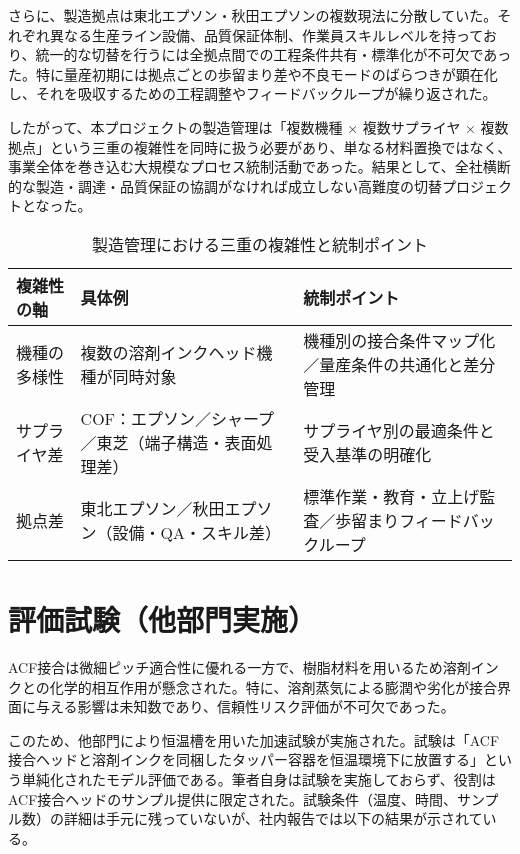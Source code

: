 \documentclass[conference]{IEEEtran}
\begin{document}
さらに、製造拠点は東北エプソン・秋田エプソンの複数現法に分散していた。それぞれ異なる生産ライン設備、品質保証体制、作業員スキルレベルを持っており、統一的な切替を行うには全拠点間での工程条件共有・標準化が不可欠であった。特に量産初期には拠点ごとの歩留まり差や不良モードのばらつきが顕在化し、それを吸収するための工程調整やフィードバックループが繰り返された。  

したがって、本プロジェクトの製造管理は「複数機種 × 複数サプライヤ × 複数拠点」という三重の複雑性を同時に扱う必要があり、単なる材料置換ではなく、事業全体を巻き込む大規模なプロセス統制活動であった。結果として、全社横断的な製造・調達・品質保証の協調がなければ成立しない高難度の切替プロジェクトとなった。

\begin{table}[t]
\centering
\footnotesize
\caption{製造管理における三重の複雑性と統制ポイント}
\label{tab:complexity}
\renewcommand{\arraystretch}{1.1}
\begin{tabularx}{\columnwidth}{@{}p{2.4cm} Y Y@{}}
\toprule
複雑性の軸 & 具体例 & 統制ポイント \\
\midrule
機種の多様性 &
複数の溶剤インクヘッド機種が同時対象 &
機種別の接合条件マップ化／量産条件の共通化と差分管理 \\
\addlinespace[2pt]
サプライヤ差 &
COF：エプソン／シャープ／東芝（端子構造・表面処理差） &
サプライヤ別の最適条件と受入基準の明確化 \\
\addlinespace[2pt]
拠点差 &
東北エプソン／秋田エプソン（設備・QA・スキル差） &
標準作業・教育・立上げ監査／歩留まりフィードバックループ \\
\bottomrule
\end{tabularx}
\end{table}

\section{評価試験（他部門実施）}
ACF接合は微細ピッチ適合性に優れる一方で、樹脂材料を用いるため溶剤インクとの化学的相互作用が懸念された。特に、溶剤蒸気による膨潤や劣化が接合界面に与える影響は未知数であり、信頼性リスク評価が不可欠であった。  

このため、他部門により恒温槽を用いた加速試験が実施された。試験は「ACF接合ヘッドと溶剤インクを同梱したタッパー容器を恒温環境下に放置する」という単純化されたモデル評価である。筆者自身は試験を実施しておらず、役割はACF接合ヘッドのサンプル提供に限定された。試験条件（温度、時間、サンプル数）の詳細は手元に残っていないが、社内報告では以下の結果が示されている。
\end{document}
